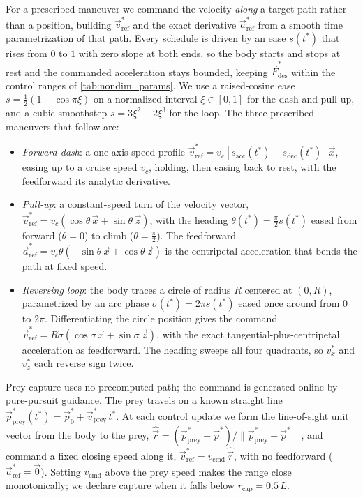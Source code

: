 \documentclass[11pt,letterpaper]{article}
\begin{document}
For a prescribed maneuver we command the velocity \emph{along} a target path rather
than a position, building $\vec{v}_\text{ref}^*$ and the exact derivative
$\vec{a}_\text{ref}^*$ from a smooth time parametrization of that path. Every schedule is
driven by an ease $s(t^*)$ that rises from $0$ to $1$ with zero slope at both ends, so
the body starts and stops at rest and the commanded acceleration stays bounded, keeping
$\vec{F}_\text{des}^*$ within the control ranges of \autoref{tab:nondim_params}. We use a
raised-cosine ease $s = \tfrac12\left(1 - \cos\pi\xi\right)$ on a normalized interval
$\xi \in [0,1]$ for the dash and pull-up, and a cubic smoothstep $s = 3\xi^2 - 2\xi^3$
for the loop. The three prescribed maneuvers that follow are:
\begin{itemize}
    \item \emph{Forward dash}: a one-axis speed profile
    $\vec{v}_\text{ref}^* = v_c\left[s_\text{acc}(t^*) - s_\text{dec}(t^*)\right]\vec{x}$,
    easing up to a cruise speed $v_c$, holding, then easing back to rest, with the
    feedforward its analytic derivative.
    \item \emph{Pull-up}: a constant-speed turn of the velocity vector,
    $\vec{v}_\text{ref}^* = v_c\left(\cos\theta\,\vec{x} + \sin\theta\,\vec{z}\right)$,
    with the heading $\theta(t^*) = \tfrac\pi2 s(t^*)$ eased from forward ($\theta = 0$)
    to climb ($\theta = \tfrac\pi2$). The feedforward
    $\vec{a}_\text{ref}^* = v_c\dot\theta\left(-\sin\theta\,\vec{x} + \cos\theta\,\vec{z}\right)$
    is the centripetal acceleration that bends the path at fixed speed.
    \item \emph{Reversing loop}: the body traces a circle of radius $R$ centered at
    $(0,R)$, parametrized by an arc phase $\sigma(t^*) = 2\pi s(t^*)$ eased once around
    from $0$ to $2\pi$. Differentiating the circle position gives the command
    $\vec{v}_\text{ref}^* = R\dot\sigma\left(\cos\sigma\,\vec{x} + \sin\sigma\,\vec{z}\right)$,
    with the exact tangential-plus-centripetal acceleration as feedforward. The heading
    sweeps all four quadrants, so $v_x^*$ and $v_z^*$ each reverse sign twice.
\end{itemize}

Prey capture uses no precomputed path; the command is generated online by pure-pursuit
guidance. The prey travels on a known straight line
$\vec{p}_\text{prey}^*(t^*) = \vec{p}_0^* + \vec{v}_\text{prey}^*\, t^*$. At each control
update we form the line-of-sight unit vector from the body to the prey,
$\hat{\vec{r}} = \left(\vec{p}_\text{prey}^* - \vec{p}^*\right) / \lVert \vec{p}_\text{prey}^* - \vec{p}^* \rVert$,
and command a fixed closing speed along it, $\vec{v}_\text{ref}^* = v_\text{cmd}\,\hat{\vec{r}}$,
with no feedforward ($\vec{a}_\text{ref}^* = \vec{0}$). Setting $v_\text{cmd}$ above the
prey speed makes the range close monotonically; we declare capture when it falls below
$r_\text{cap} = 0.5\,L$.
\end{document}

